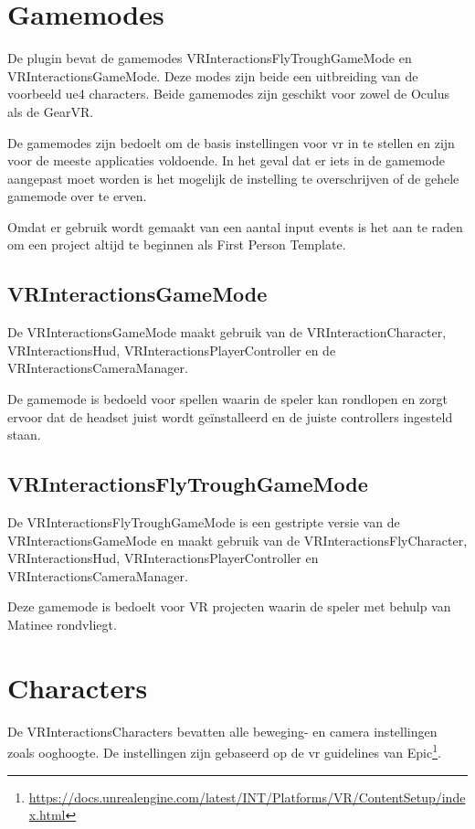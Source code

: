\section{Gamemodes}
De plugin bevat de gamemodes VRInteractionsFlyTroughGameMode en VRInteractionsGameMode. Deze modes zijn beide een uitbreiding van de voorbeeld \gls{ue4} characters. Beide gamemodes zijn geschikt voor zowel de Oculus als de GearVR. 

De gamemodes zijn bedoelt om de basis instellingen voor \gls{vr} in te stellen en zijn voor de meeste applicaties voldoende. In het geval dat er iets in de gamemode aangepast moet worden is het mogelijk de instelling te overschrijven of de gehele gamemode over te erven.

Omdat er gebruik wordt gemaakt van een aantal input events is het aan te raden om een project altijd te beginnen als First Person Template.

\subsection{VRInteractionsGameMode}
De VRInteractionsGameMode maakt gebruik van de VRInteractionCharacter, VRInteractionsHud, VRInteractionsPlayerController en de VRInteractionsCameraManager. 

De gamemode is bedoeld voor spellen waarin de speler kan rondlopen en zorgt ervoor dat de headset juist wordt geïnstalleerd en de juiste controllers ingesteld staan.

\subsection{VRInteractionsFlyTroughGameMode}
De VRInteractionsFlyTroughGameMode is een gestripte versie van de VRInteractionsGameMode en maakt gebruik van de VRInteractionsFlyCharacter, VRInteractionsHud, VRInteractionsPlayerController en VRInteractionsCameraManager.

Deze gamemode is bedoelt voor VR projecten waarin de speler met behulp van Matinee rondvliegt.

\section{Characters}
De VRInteractionsCharacters bevatten alle beweging- en camera instellingen zoals ooghoogte. De instellingen zijn gebaseerd op de \gls{vr} guidelines van Epic\footnote{\href{https://docs.unrealengine.com/latest/INT/Platforms/VR/ContentSetup/index.html}{https://docs.unrealengine.com/latest/INT/Platforms/VR/ContentSetup/index.html} }.


